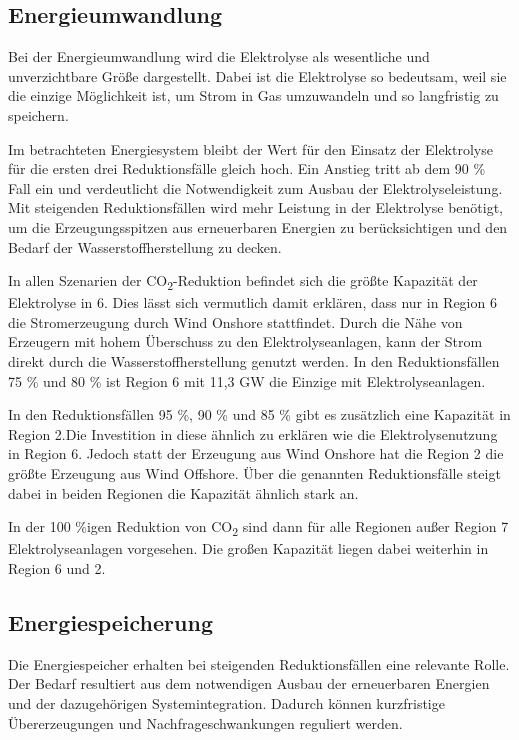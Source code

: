 \subsection{Energieumwandlung}
Bei der Energieumwandlung wird die Elektrolyse als wesentliche und unverzichtbare Größe dargestellt. Dabei ist die Elektrolyse so bedeutsam, weil sie die einzige Möglichkeit ist, um Strom in Gas umzuwandeln und so langfristig zu speichern.

Im betrachteten Energiesystem bleibt der Wert für den Einsatz der Elektrolyse für die ersten drei Reduktionsfälle gleich hoch. Ein Anstieg tritt ab dem 90 \% Fall ein und verdeutlicht die Notwendigkeit zum Ausbau der Elektrolyseleistung. Mit steigenden Reduktionsfällen wird mehr Leistung in der Elektrolyse benötigt, um die Erzeugungsspitzen aus erneuerbaren Energien zu berücksichtigen und den Bedarf der Wasserstoffherstellung zu decken. 

In allen Szenarien der CO\textsubscript{2}-Reduktion befindet sich die größte Kapazität der Elektrolyse in 6. Dies lässt sich vermutlich damit erklären, dass nur in Region 6 die Stromerzeugung durch Wind Onshore stattfindet. Durch die Nähe von Erzeugern mit hohem Überschuss zu den Elektrolyseanlagen, kann der Strom direkt durch die Wasserstoffherstellung genutzt werden. In den Reduktionsfällen 75 \% und 80 \% ist Region 6 mit 11,3 GW die Einzige mit Elektrolyseanlagen.

In den Reduktionsfällen 95 \%, 90 \% und 85 \% gibt es zusätzlich eine Kapazität in Region 2.Die Investition in diese ähnlich zu erklären wie die Elektrolysenutzung in Region 6. Jedoch statt der Erzeugung aus Wind Onshore hat die Region 2 die größte Erzeugung aus Wind Offshore.
Über die genannten Reduktionsfälle steigt dabei in beiden Regionen die Kapazität ähnlich stark an. 

In der 100 \%igen Reduktion von CO\textsubscript{2} sind dann für alle Regionen außer Region 7 Elektrolyseanlagen vorgesehen. Die großen Kapazität liegen dabei weiterhin in Region 6 und 2.

\subsection{Energiespeicherung}
Die Energiespeicher erhalten bei steigenden Reduktionsfällen eine relevante Rolle. Der Bedarf resultiert aus dem notwendigen Ausbau der erneuerbaren Energien und der dazugehörigen Systemintegration. Dadurch können kurzfristige Übererzeugungen und Nachfrageschwankungen reguliert werden. 

